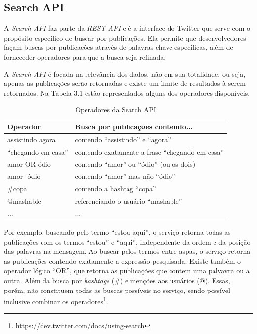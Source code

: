 \subsection*{Search API}

A \textit{Search API} faz parte da \textit{REST API} e é a interface do Twitter que serve com o propósito específico de buscar por publicações. Ela permite que desenvolvedores façam buscas por publicacões através de palavras-chave específicas, além de forneceder operadores para que a busca seja refinada. 

A \textit{Search API} é focada na relevância dos dados, não em sua totalidade, ou seja, apenas as publicações serão retornadas e existe um limite de resultados à serem retornados. Na Tabela 3.1 estão representados alguns dos operadores disponíveis.

\begin{table}[ht]
	\caption{Operadores da Search API}
	\centering
	\begin{tabular}{| l | l |}
		\hline
		\textbf{Operador} & \textbf{Busca por publicações contendo...} \\ [0.5ex] \hline \hline
    assistindo agora & contendo ``assistindo'' e ``agora'' \\
    ``chegando em casa'' & contendo exatamente a frase ``chegando em casa'' \\
    amor OR ódio & contendo ``amor'' ou ``ódio'' (ou os dois) \\
    amor -ódio & contendo ``amor'' mas não ``ódio'' \\
    \#copa & contendo a hashtag ``copa'' \\
    @mashable & referenciando o usuário ``mashable''  \\ 
    ... & ... \\ [1ex]
		\hline
	\end{tabular}
	\label{table:nonlin}
\end{table}

Por exemplo, buscando pelo termo ``estou aqui'', o serviço retorna todas as publicações com os termos ``estou'' e ``aqui'', independente da ordem e da posição das palavras na mensagem. Ao buscar pelos termos entre aspas, o serviço retorna as publicações contendo exatamente a expressão pesquisada. Existe também o operador lógico ``OR'', que retorna as publicações que contem uma palvavra ou a outra. Além da busca por \textit{hashtags} (\#) e menções aos usuários (@). Essas, porém, não constituem todas as buscas possíveis no serviço, sendo possível inclusive combinar os operadores\footnote{https://dev.twitter.com/docs/using-search}.

